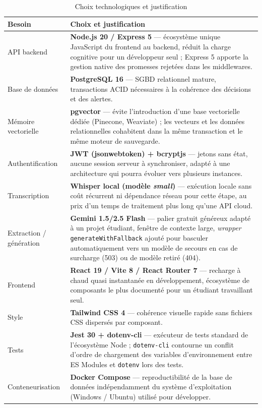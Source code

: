 \documentclass[12pt, a4paper]{article}
\begin{document}
\begin{table}[H]
\centering
\caption{Choix technologiques et justification}
\label{tab:frameworks}
\begin{tabularx}{\textwidth}{lX}
\toprule
\textbf{Besoin} & \textbf{Choix et justification} \\
\midrule
API backend & \textbf{Node.js 20 / Express 5} — écosystème unique JavaScript du frontend au backend, réduit la charge cognitive pour un développeur seul ; Express 5 apporte la gestion native des promesses rejetées dans les middlewares. \\
Base de données & \textbf{PostgreSQL 16} — SGBD relationnel mature, transactions ACID nécessaires à la cohérence des décisions et des alertes. \\
Mémoire vectorielle & \textbf{pgvector} \parencite{pgvector2024} — évite l'introduction d'une base vectorielle dédiée (Pinecone, Weaviate) ; les vecteurs et les données relationnelles cohabitent dans la même transaction et le même moteur de sauvegarde. \\
Authentification & \textbf{JWT (jsonwebtoken) + bcryptjs} \parencite{openai2023jwt} — jetons sans état, aucune session serveur à synchroniser, adapté à une architecture qui pourra évoluer vers plusieurs instances. \\
Transcription & \textbf{Whisper local (modèle \textit{small})} \parencite{radford2022whisper} — exécution locale sans coût récurrent ni dépendance réseau pour cette étape, au prix d'un temps de traitement plus long qu'une API cloud. \\
Extraction / génération & \textbf{Gemini 1.5/2.5 Flash} \parencite{google2024gemini} — palier gratuit généreux adapté à un projet étudiant, fenêtre de contexte large, \textit{wrapper} \texttt{generateWithFallback} ajouté pour basculer automatiquement vers un modèle de secours en cas de surcharge (503) ou de modèle retiré (404). \\
Frontend & \textbf{React 19 / Vite 8 / React Router 7} — recharge à chaud quasi instantanée en développement, écosystème de composants le plus documenté pour un étudiant travaillant seul. \\
Style & \textbf{Tailwind CSS 4} — cohérence visuelle rapide sans fichiers CSS dispersés par composant. \\
Tests & \textbf{Jest 30 + dotenv-cli} — exécuteur de tests standard de l'écosystème Node ; \texttt{dotenv-cli} contourne un conflit d'ordre de chargement des variables d'environnement entre ES Modules et \texttt{dotenv} lors des tests. \\
Conteneurisation & \textbf{Docker Compose} — reproductibilité de la base de données indépendamment du système d'exploitation (Windows / Ubuntu) utilisé pour développer. \\
\bottomrule
\end{tabularx}
\end{table}
\end{document}
